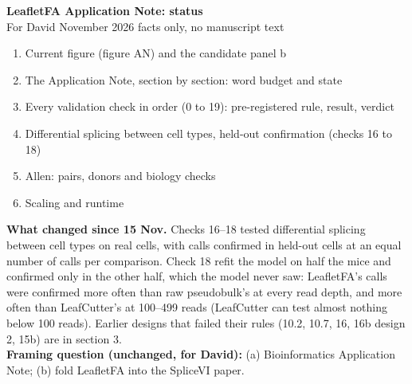 \documentclass[10pt]{article}
\begin{document}
{\Large\bfseries LeafletFA Application Note: status}\\[2pt]
For David \quad\textbar{} November 2026 \quad\textbar\quad facts only, no manuscript text

\begin{enumerate}
  \item Current figure (figure AN) and the candidate panel b
  \item The Application Note, section by section: word budget and state
  \item Every validation check in order (0 to 19): pre-registered rule, result, verdict
  \item Differential splicing between cell types, held-out confirmation (checks 16 to 18)
  \item Allen: pairs, donors and biology checks
  \item Scaling and runtime
\end{enumerate}

\textbf{What changed since 15 Nov.} Checks 16--18 tested differential splicing between cell types on real cells, with calls
confirmed in held-out cells at an equal number of calls per comparison. Check 18 refit the model on half the mice and confirmed only in
the other half, which the model never saw: LeafletFA's calls were confirmed more often than raw pseudobulk's at every read
depth, and more often than LeafCutter's at 100--499 reads (LeafCutter can test almost nothing below 100 reads). Earlier
designs that failed their rules (10.2, 10.7, 16, 16b design 2, 15b) are in section 3.\\
\textbf{Framing question (unchanged, for David):} (a) Bioinformatics Application Note; (b) fold LeafletFA into the SpliceVI paper.
\end{document}
